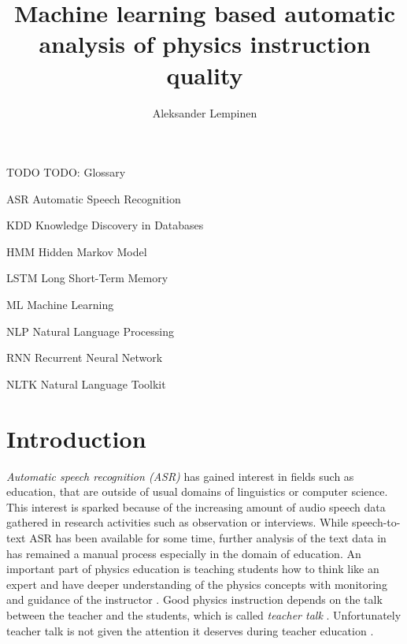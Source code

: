 \documentclass[utf8,english]{gradu3}
\begin{document}
\title{Machine learning based automatic analysis of physics instruction quality}

\author{Aleksander Lempinen}



\maketitle

\begin{thetermlist}
\item[TODO] TODO: Glossary
\item[ASR] Automatic Speech Recognition
\item[KDD] Knowledge Discovery in Databases 
\item[HMM] Hidden Markov Model
\item[LSTM] Long Short-Term Memory 
\item[ML] Machine Learning
\item[NLP] Natural Language Processing
\item[RNN] Recurrent Neural Network
\item[NLTK] Natural Language Toolkit
\end{thetermlist}

\mainmatter




\chapter{Introduction}

\emph{Automatic speech recognition (ASR)} has gained interest in fields such as education, that are outside of usual domains of linguistics or computer science. This interest is sparked because of the increasing amount of audio speech data gathered in research activities such as observation or interviews. While speech-to-text ASR has been available for some time, further analysis of the text data in has remained a manual process especially in the domain of education. An important part of physics education is teaching students how to think like an expert and have deeper understanding of the physics concepts with monitoring and guidance of the instructor \parencite{wiemanTransformingPhysicsEducation2007}. Good physics instruction depends on the talk between the teacher and the students, which is called \emph{teacher talk} \parencite{scottTeachingScienceMeaningful2007}. Unfortunately teacher talk is not given the attention it deserves during teacher education \parencite{crespoPraisingCorrectingProspective2002,lehesvuoriDialogicTeachingScience2013}. 
\end{document}
